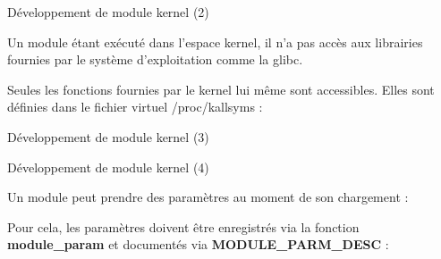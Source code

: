 \documentclass[12pt, t]{beamer}
\begin{document}
\begin{frame}{Développement de module kernel (2)}

    \vspace{12pt}
    Un module étant exécuté dans l'espace kernel, il n'a pas accès aux
    librairies fournies par le système d'exploitation comme la glibc.

    {
        \vspace{12pt}
        Seules les fonctions fournies par le kernel lui même sont accessibles. Elles
        sont définies dans le fichier virtuel /proc/kallsyms :

        \vspace{12pt}
        \lstsyms
    }

\end{frame}

\begin{frame}{Développement de module kernel (3)}

    

\end{frame}



\begin{frame}{Développement de module kernel (4)}

    \vspace{15pt}
    Un module peut prendre des paramètres au moment de son chargement :

    \vspace{6pt}
    \lstload

    {
        \vspace{15pt}
        Pour cela, les paramètres doivent être enregistrés via la fonction
        {\textbf{module\_param}} et documentés via
        {\textbf{MODULE\_PARM\_DESC}} :

        \vspace{6pt}
        \lstparam
    }

\end{frame}
\end{document}
